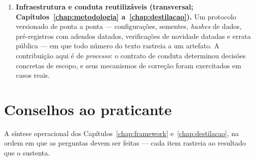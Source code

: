 \begin{enumerate}
\begin{enumerate}
    capítulo --- a refutação da destilação pontual, a refutação da
    hipótese da cauda pesada, os reveses do E1 (em 3 de 20
    conjuntos, uma QRF nativa vence o destilado) e a fronteira de
    serviço: rodar a transformação do alvo como diagnóstico, testar
    um nativo forte e destilar somente a vantagem genuína que
    sobreviver --- pré-condição mensurável por uma única rotulagem
    OOF, de minutos a poucas horas conforme o \emph{pool} e o
    professor (o \emph{gate} foi verificado na versão oráculo; a
    versão OOF não foi avaliada). É a forma operacional da resposta à
    QP3.
  \end{enumerate}
  \item \textbf{Infraestrutura e conduta reutilizáveis (transversal;
    Capítulos~\ref{chap:metodologia} a~\ref{chap:destilacao}).} Um
    protocolo versionado de ponta a ponta --- configurações, sementes,
    \emph{hashes} de dados, pré-registros com adendos datados,
    verificações de novidade datadas e errata pública --- em que todo
    número do texto rastreia a um artefato. A contribuição aqui é de
    \emph{processo}: o contrato de conduta determinou decisões concretas
    de escopo, e seus mecanismos de correção foram exercitados em casos
    reais.
\end{enumerate}

\section{Conselhos ao praticante}
\label{sec:conc-conselhos}

A síntese operacional dos Capítulos~\ref{chap:framework}
e~\ref{chap:destilacao}, na ordem em que as perguntas devem ser feitas
--- cada item rastreia ao resultado que o sustenta.


